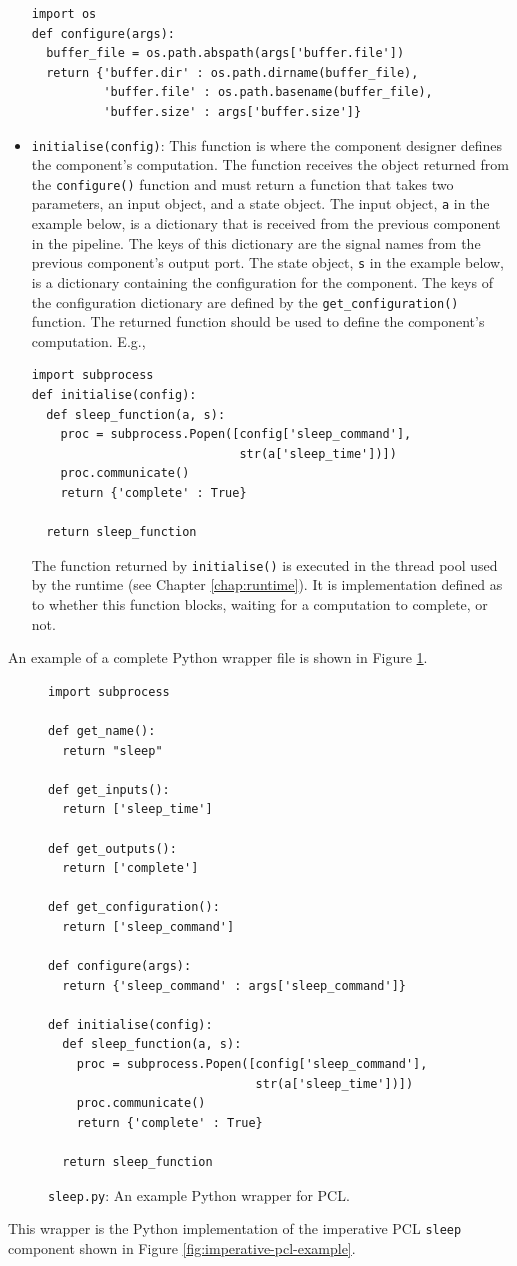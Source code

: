 \begin{itemize}
\begin{verbatim}
import os
def configure(args):
  buffer_file = os.path.abspath(args['buffer.file'])
  return {'buffer.dir' : os.path.dirname(buffer_file),
          'buffer.file' : os.path.basename(buffer_file),
          'buffer.size' : args['buffer.size']}
\end{verbatim}
\item \texttt{initialise(config)}: This function is where the component designer defines the component's computation. The function receives the object returned from the \texttt{configure()} function and must return a function that takes two parameters, an input object, and a state object. The input object, \texttt{a} in the example below, is a dictionary that is received from the previous component in the pipeline. The keys of this dictionary are the signal names from the previous component's output port. The state object, \texttt{s} in the example below, is a dictionary containing the configuration for the component. The keys of the configuration dictionary are defined by the \texttt{get\_configuration()} function. The returned function should be used to define the component's computation. E.g.,
\begin{verbatim}
import subprocess
def initialise(config):
  def sleep_function(a, s):
    proc = subprocess.Popen([config['sleep_command'],
                             str(a['sleep_time'])])
    proc.communicate()
    return {'complete' : True}

  return sleep_function
\end{verbatim}
The function returned by \texttt{initialise()} is executed in the thread pool used by the runtime (see Chapter \ref{chap:runtime}). It is implementation defined as to whether this function blocks, waiting for a computation to complete, or not.
\end{itemize}

An example of a complete Python wrapper file is shown in Figure \ref{fig:python-wrapper}.
\begin{figure}[h!]
\begin{verbatim}
import subprocess

def get_name():
  return "sleep"

def get_inputs():
  return ['sleep_time']

def get_outputs():
  return ['complete']

def get_configuration():
  return ['sleep_command']

def configure(args):
  return {'sleep_command' : args['sleep_command']}

def initialise(config):
  def sleep_function(a, s):
    proc = subprocess.Popen([config['sleep_command'],
                             str(a['sleep_time'])])
    proc.communicate()
    return {'complete' : True}

  return sleep_function
\end{verbatim}
\caption{\texttt{sleep.py}: An example Python wrapper for PCL.}
\label{fig:python-wrapper}
\end{figure}
This wrapper is the Python implementation of the imperative PCL \texttt{sleep} component shown in Figure \ref{fig:imperative-pcl-example}.
